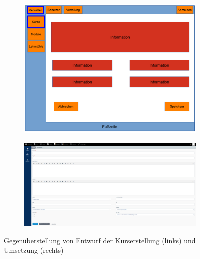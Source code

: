         \begin{figure}
            \centering
            \begin{subfigure}{0.49\textwidth}
                \includegraphics[width=1.0\textwidth]{./implementation/images/MockUpsBackend/backendEdit.png}
            \end{subfigure}
            \begin{subfigure}{0.49\textwidth}
                \includegraphics[width=1.0\textwidth]{./implementation/images/edit.png}
            \end{subfigure}
            \caption{Gegenüberstellung von Entwurf der Kurserstellung (links) und Umsetzung (rechts)}
            \label{fig:comparisonEdit}
        \end{figure}
    
